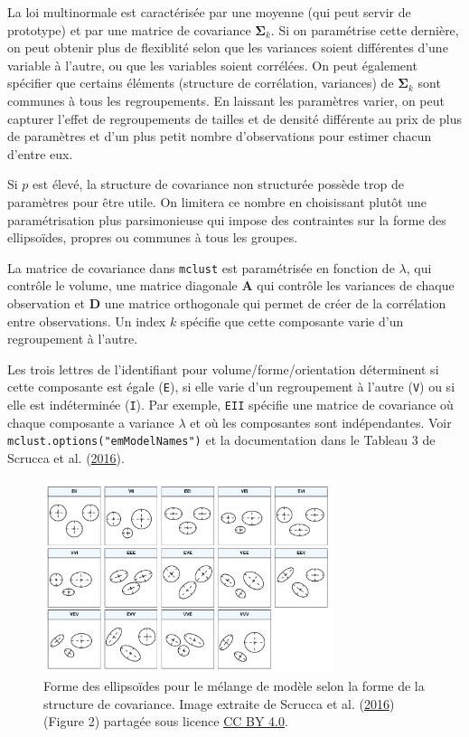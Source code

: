 \documentclass[
  11pt,
  letterpaper,
]{scrbook}
\theoremstyle{definition}
\theoremstyle{remark}
\begin{document}
La loi multinormale est caractérisée par une moyenne (qui peut servir de
prototype) et par une matrice de covariance \(\boldsymbol{\Sigma}_k\).
Si on paramétrise cette dernière, on peut obtenir plus de flexiblité
selon que les variances soient différentes d'une variable à l'autre, ou
que les variables soient corrélées. On peut également spécifier que
certains éléments (structure de corrélation, variances) de
\(\boldsymbol{\Sigma}_k\) sont communes à tous les regroupements. En
laissant les paramètres varier, on peut capturer l'effet de
regroupements de tailles et de densité différente au prix de plus de
paramètres et d'un plus petit nombre d'observations pour estimer chacun
d'entre eux.

Si \(p\) est élevé, la structure de covariance non structurée possède
trop de paramètres pour être utile. On limitera ce nombre en choisissant
plutôt une paramétrisation plus parsimonieuse qui impose des contraintes
sur la forme des ellipsoïdes, propres ou communes à tous les groupes.

La matrice de covariance dans \texttt{mclust} est paramétrisée en
fonction de \(\lambda\), qui contrôle le volume, une matrice diagonale
\(\mathbf{A}\) qui contrôle les variances de chaque observation et
\(\mathbf{D}\) une matrice orthogonale qui permet de créer de la
corrélation entre observations. Un index \(k\) spécifie que cette
composante varie d'un regroupement à l'autre.

Les trois lettres de l'identifiant pour volume/forme/orientation
déterminent si cette composante est égale (\texttt{E}), si elle varie
d'un regroupement à l'autre (\texttt{V}) ou si elle est indéterminée
(\texttt{I}). Par exemple, \texttt{EII} spécifie une matrice de
covariance où chaque composante a variance \(\lambda\) et où les
composantes sont indépendantes. Voir
\texttt{mclust.options("emModelNames")} et la documentation dans le
Tableau 3 de Scrucca et al. (\protect\hyperlink{ref-mclust5}{2016}).

\begin{figure}[ht!]

{\centering \includegraphics[width=3.35in,height=\textheight]{./figures/mclust5-parametrization.png}

}

\caption{\label{fig-modeles}Forme des ellipsoïdes pour le mélange de
modèle selon la forme de la structure de covariance. Image extraite de
Scrucca et al. (\protect\hyperlink{ref-mclust5}{2016}) (Figure 2)
partagée sous licence
\href{https://creativecommons.org/licenses/by/4.0/}{CC BY 4.0}.}

\end{figure}
\end{document}
